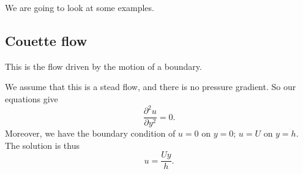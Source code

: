 \documentclass[a4paper]{article}
\begin{document}
We are going to look at some examples.
\subsection{Couette flow}
This is the flow driven by the motion of a boundary.
\begin{center}
\end{center}
We assume that this is a stead flow, and there is no pressure gradient. So our equations give
\[
  \frac{\partial^2 u}{\partial y^2} = 0.
\]
Moreover, we have the boundary condition of $u = 0$ on $y = 0$; $u = U$ on $y = h$. The solution is thus
\[
  u = \frac{U y}{h}.
\]
\end{document}
